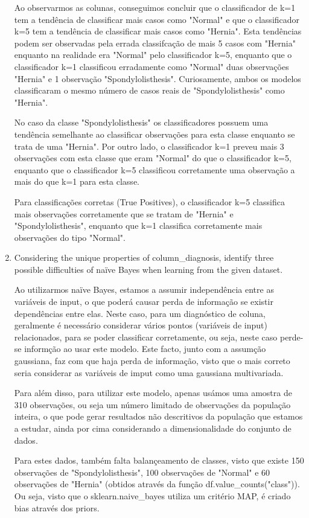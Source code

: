 \documentclass[12pt]{article}
\begin{document}
\begin{enumerate}[leftmargin=\labelsep]
    Ao observarmos as colunas, conseguimos concluir que o classificador de k=1 tem a tendência de classificar mais casos como "Normal" e que o classificador k=5 tem a tendência de classificar mais casos como "Hernia". Esta tendências podem ser observadas pela errada classifcação de mais 5 casos com "Hernia" enquanto na realidade era "Normal" pelo classificador k=5, enquanto que o classificador k=1 classificou erradamente como "Normal" duas observações "Hernia" e 1 observação "Spondylolisthesis". Curiosamente, ambos os modelos classificaram o mesmo número de casos reais de "Spondylolisthesis" como "Hernia".

    No caso da classe "Spondylolisthesis" os classificadores possuem uma tendência semelhante ao classificar observações para esta classe enquanto se trata de uma "Hernia". Por outro lado, o classificador k=1 preveu mais 3 observações com esta classe que eram "Normal" do que o classificador k=5, enquanto que o classificador k=5 classificou corretamente uma observação a mais do que k=1 para esta classe.

    Para classificações corretas (True Positives), o classificador k=5 classifica mais observações corretamente que se tratam de "Hernia" e "Spondylolisthesis", enquanto que k=1 classifica corretamente mais observações do tipo "Normal".

    \item Considering the unique properties of column\_diagnosis, identify three possible difficulties
    of naïve Bayes when learning from the given dataset.

    Ao utilizarmos naïve Bayes, estamos a assumir independência entre as variáveis de input, o que poderá causar perda de informação se existir dependências entre elas. Neste caso, para um diagnóstico de coluna, geralmente é necessário considerar vários pontos (variáveis de input) relacionados, para se poder classificar corretamente, ou seja, neste caso perde-se informção ao usar este modelo. Este facto, junto com a assumção gaussiana, faz com que haja perda de informação, visto que o mais correto seria considerar as variáveis de imput como uma gaussiana multivariada.

    Para além disso, para utilizar este modelo, apenas usámos uma amostra de 310 observações, ou seja um número limitado de observações da população inteira, o que pode gerar resultados não descritivos da população que estamos a estudar, ainda por cima considerando a dimensionalidade do conjunto de dados.

    Para estes dados, também falta balançeamento de classes, visto que existe 150 observações de "Spondylolisthesis", 100 observações de "Normal" e 60 observações de "Hernia" (obtidos através da função df.value\_counts("class")). Ou seja, visto que o sklearn.naive\_bayes utiliza um critério MAP, é criado bias através dos priors.


\end{enumerate}
\end{document}
